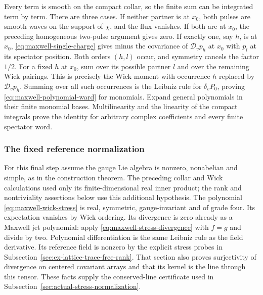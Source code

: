 Every term is smooth on the compact collar, so the finite sum can be
integrated term by term. There are three cases. If neither partner
is at $x_0$, both pulses are smooth waves on the support of $\chi$,
and the flux vanishes. If both are at $x_0$, the preceding homogeneous
two-pulse argument gives zero. If exactly one, say $h$, is at $x_0$,
\eqref{eq:maxwell-single-charge} gives minus the covariance of
$\mathscr D_vp_h$ at $x_0$ with $p_l$ at its spectator position.
Both orders $(h,l)$ occur, and symmetry cancels the factor $1/2$.
For a fixed $h$ at $x_0$, sum over its possible partner $l$ and
over the remaining Wick pairings. This is precisely the Wick moment
with occurrence $h$ replaced by $\mathscr D_vp_h$. Summing over all
such occurrences is the Leibniz rule for $\delta_vP_0$, proving
\eqref{eq:maxwell-polynomial-ward} for monomials. Expand general
polynomials in their finite monomial bases. Multilinearity and the
linearity of the compact integrals prove the identity for arbitrary
complex coefficients and every finite spectator word.

\subsubsection{The fixed reference normalization}
For this final step assume the gauge Lie algebra is nonzero, nonabelian
and simple, as in the construction theorem. The preceding collar and Wick
calculations used only its finite-dimensional real inner product; the
rank and nontriviality assertions below use this additional hypothesis.
The polynomial \eqref{eq:maxwell-wick-stress} is real, symmetric,
gauge-invariant and of grade four. Its expectation vanishes by Wick
ordering. Its divergence is zero already as a Maxwell jet polynomial:
apply \eqref{eq:maxwell-stress-divergence} with $f=g$ and divide
by two. Polynomial differentiation is the same Leibniz rule as the
field derivative. Its reference field is nonzero by the explicit
stress probes in Subsection~\ref{sec:ex-lattice-trace-free-rank}.
That section also proves surjectivity of divergence on centered
covariant arrays and that its kernel is the line through this tensor.
These facts supply the conserved-line certificate used in
Subsection~\ref{sec:actual-stress-normalization}.

